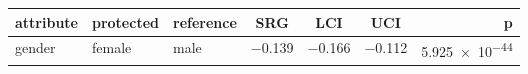 \AccessibleTableHeaderRow
\begin{tabular}{lllSSSr}
\toprule
attribute & protected & reference & {SRG} & {LCI} & {UCI} & {p}\\
\midrule
gender & female & male & \num{-0.139} & \num{-0.166} & \num{-0.112} & \num[round-mode=figures,round-precision=3]{5.925e-44}\\
\bottomrule
\end{tabular}
